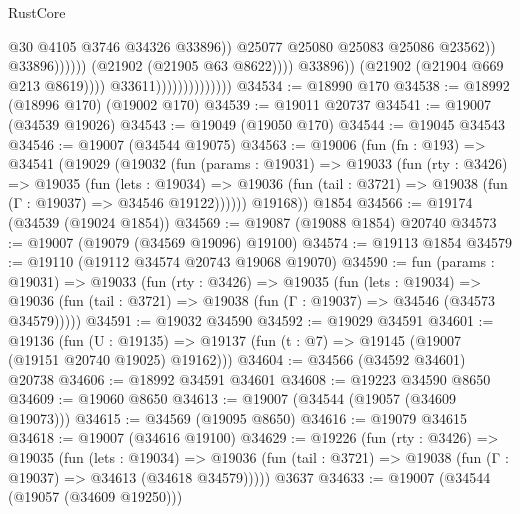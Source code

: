 \begin{lexlean}{RustCore}
\begin{coremodule}
                                                                @30
                                                                @4105
                                                                @3746
                                                                @34326
                                                                @33896))
                                                            @25077
                                                            @25080
                                                            @25083
                                                            @25086
                                                            @23562))
                                                        @33896))))))
                                            (@21902 (@21905 @63 @8622))))
                                        @33896))
                                    (@21902 (@21904 @669 @213 @8619))))
                                @33611))))))))))))))
@34534 := @18990 @170
@34538 := @18992 (@18996 @170) (@19002 @170)
@34539 := @19011 @20737
@34541 := @19007 (@34539 @19026)
@34543 := @19049 (@19050 @170)
@34544 := @19045 @34543
@34546 := @19007 (@34544 @19075)
@34563 := @19006
    (fun (fn : @193) =>
    @34541
      (@19029
        (@19032
          (fun (params : @19031) =>
          @19033
            (fun (rty : @3426) =>
            @19035
              (fun (lets : @19034) =>
              @19036 (fun (tail : @3721) => @19038 (fun (Γ : @19037) => @34546 @19122))))))
        @19168))
    @1854
@34566 := @19174 (@34539 (@19024 @1854))
@34569 := @19087 (@19088 @1854) @20740
@34573 := @19007 (@19079 (@34569 @19096) @19100)
@34574 := @19113 @1854
@34579 := @19110 (@19112 @34574 @20743 @19068 @19070)
@34590 := fun (params : @19031) =>
  @19033
    (fun (rty : @3426) =>
    @19035
      (fun (lets : @19034) =>
      @19036 (fun (tail : @3721) => @19038 (fun (Γ : @19037) => @34546 (@34573 @34579)))))
@34591 := @19032 @34590
@34592 := @19029 @34591
@34601 := @19136
    (fun (U : @19135) => @19137 (fun (t : @7) => @19145 (@19007 (@19151 @20740 @19025) @19162)))
@34604 := @34566 (@34592 @34601) @20738
@34606 := @18992 @34591 @34601
@34608 := @19223 @34590 @8650
@34609 := @19060 @8650
@34613 := @19007 (@34544 (@19057 (@34609 @19073)))
@34615 := @34569 (@19095 @8650)
@34616 := @19079 @34615
@34618 := @19007 (@34616 @19100)
@34629 := @19226
    (fun (rty : @3426) =>
    @19035
      (fun (lets : @19034) =>
      @19036 (fun (tail : @3721) => @19038 (fun (Γ : @19037) => @34613 (@34618 @34579)))))
    @3637
@34633 := @19007 (@34544 (@19057 (@34609 @19250)))

\end{coremodule}
\end{lexlean}

